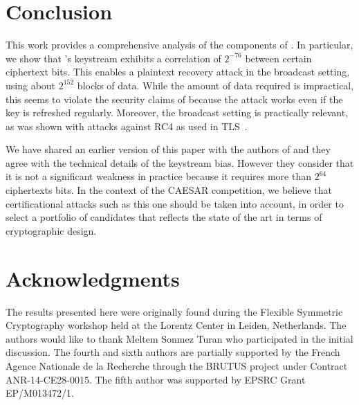 
\section{Conclusion}
\label{sec/Conclusion}

This work provides a comprehensive analysis of the components of
\MORUS.  In particular, we show that \MORUS[1280]'s keystream exhibits a correlation of $2^{-76}$ between certain ciphertext bits. This enables a plaintext recovery
attack in the broadcast setting, using about $2^{152}$ blocks of data.
While the amount of data required is impractical, this seems to
violate the security claims of \MORUS[1280] because the attack works
even if the key is refreshed regularly.  Moreover, the broadcast
setting is practically relevant, as was shown with attacks against RC4
as used in TLS~\cite{DBLP:conf/uss/AlFardanBPPS13}.

We have shared an earlier version of this paper with the authors of
\MORUS and they agree with the technical details of the keystream
bias.  However they consider that it is not a significant weakness in
practice because it requires more than $2^{64}$ ciphertexts bits.  In
the context of the CAESAR competition, we believe that certificational
attacks such as this one should be taken into account, in order to
select a portfolio of candidates that reflects the state of the art in
terms of cryptographic design.

\ifanonymous
\else
\section{Acknowledgments}

The results presented here were originally found during the Flexible
Symmetric Cryptography workshop held at the Lorentz Center in Leiden,
Netherlands.  The authors would like to thank Meltem Sonmez Turan who
participated in the initial discussion.
The fourth and sixth authors
are partially supported by the French Agence Nationale de la Recherche
through the BRUTUS project under Contract ANR-14-CE28-0015.
The fifth author was supported by EPSRC Grant EP/M013472/1.

\fi

\FloatBarrier

